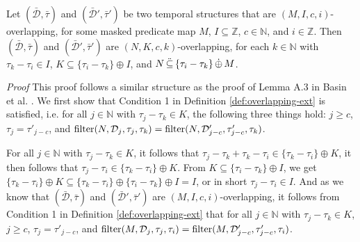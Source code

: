 \begin{lemma}
    \label{lem:eri-overlap-transitivity}
    Let $(\bar{\mathcal{D}}, \bar{\tau})$
        and
        $(\bar{\mathcal{D}}', \bar{\tau}')$ be two temporal structures that are $(M,I,c,i)$-overlapping,
            for some masked predicate map $M$,
            $I \subseteq \mathbb{Z}$,
            $c \in \mathbb{N}$,
            and $i \in \mathbb{Z}$.
    Then $(\bar{\mathcal{D}}, \bar{\tau})$ and $(\bar{\mathcal{D}}', \bar{\tau}')$
    are $(N, K, c, k)$-overlapping,
        for each $k \in \mathbb{N}$
        with $\tau_k - \tau_i \in I$, $K \subseteq \{ \tau_i - \tau_k \} \oplus I$,
        and $N \,\ddot{\subseteq}\, \{ \tau_i - \tau_k \} \,\dot{\oplus}\, M$.
\end{lemma}
\textit{Proof} 
This proof follows a similar structure as the proof of Lemma A.3 in Basin et al. \cite{Basin2016}.
We first show that Condition 1 in Definition \ref{def:overlapping-ext} is satisfied, i.e.
for all $j \in \mathbb{N}$ with $\tau_j - \tau_k \in K$,
the following three things hold:
$j \geq c$,
$\tau_j = \tau'_{j-c}$,
and
$ \operatorname{filter}(N, \mathcal{D}_j, \tau_j, \tau_k) = \operatorname{filter}(N, \mathcal{D}'_{j-c}, \tau'_{j-c}, \tau_k)$.

For all $j \in \mathbb{N}$ with $\tau_j - \tau_k \in K$,
    it follows that $\tau_j - \tau_k + \tau_k - \tau_i \in \{\tau_k - \tau_i \} \oplus K$,
    it then follows that $\tau_j - \tau_i \in \{\tau_k - \tau_i\} \oplus K$. 
From $K \subseteq \{ \tau_i - \tau_k \} \oplus I$,
    we get $\{\tau_k - \tau_i\} \oplus K \subseteq \{\tau_k - \tau_i \} \oplus \{\tau_i - \tau_k \} \oplus I = I$,
    or in short $\tau_j - \tau_i \in I$.
And as we know that $(\bar{\mathcal{D}}, \bar{\tau})$
    and $(\bar{\mathcal{D}}', \bar{\tau}')$ are $(M,I,c,i)$-overlapping,
    it follows from Condition 1 in Definition \ref{def:overlapping-ext} that
    for all $j \in \mathbb{N}$ with $\tau_j - \tau_k \in K$,
    $j \geq c$, $\tau_j = \tau'_{j-c}$,
    and $\operatorname{filter}(M, \mathcal{D}_j, \tau_j, \tau_i) = \operatorname{filter}(M, \mathcal{D}'_{j-c}, \tau'_{j-c}, \tau_i)$.

